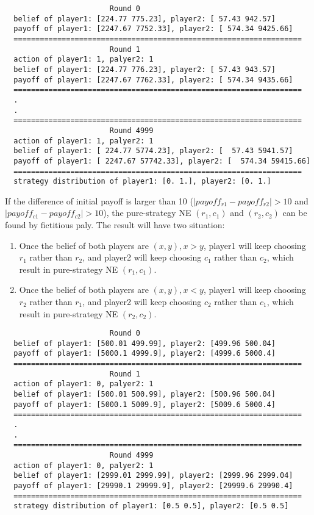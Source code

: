 \documentclass[a4paper, oneside, final, 12pt]{scrartcl} %
\begin{document}
\begin{lstlisting}
                        Round 0
  belief of player1: [224.77 775.23], player2: [ 57.43 942.57]
  payoff of player1: [2247.67 7752.33], player2: [ 574.34 9425.66]
  ==================================================================
                        Round 1
  action of player1: 1, palyer2: 1
  belief of player1: [224.77 776.23], player2: [ 57.43 943.57]
  payoff of player1: [2247.67 7762.33], player2: [ 574.34 9435.66]
  ==================================================================
  .
  .
  ==================================================================
                        Round 4999
  action of player1: 1, palyer2: 1
  belief of player1: [ 224.77 5774.23], player2: [  57.43 5941.57]
  payoff of player1: [ 2247.67 57742.33], player2: [  574.34 59415.66]
  ==================================================================
  strategy distribution of player1: [0. 1.], player2: [0. 1.]
\end{lstlisting}

\begingroup
\raggedright
If the difference of initial payoff is larger than 10
($|payoff_{r1} - payoff_{r2}| > 10$ and $|payoff_{c1} - payoff_{c2}| > 10$),
the pure-strategy NE $(r_1, c_1)$ and $(r_2, c_2)$ 
can be found by fictitious paly. The result will have two situation:

\newpage

\begin{enumerate}
  \item Once the belief of both players are $(x, y), x > y$, 
  player1 will keep choosing $r_1$ rather than $r_2$, 
  and player2 will keep choosing $c_1$ rather than $c_2$, 
  which result in pure-strategy NE $(r_1, c_1)$.
  \item Once the belief of both players are $(x, y), x < y$, 
  player1 will keep choosing $r_2$ rather than $r_1$, 
  and player2 will keep choosing $c_2$ rather than $c_1$, 
  which result in pure-strategy NE $(r_2, c_2)$.
\end{enumerate}

\endgroup

\begin{lstlisting}
                        Round 0
  belief of player1: [500.01 499.99], player2: [499.96 500.04]
  payoff of player1: [5000.1 4999.9], player2: [4999.6 5000.4]
  ==================================================================
                        Round 1
  action of player1: 0, palyer2: 1
  belief of player1: [500.01 500.99], player2: [500.96 500.04]
  payoff of player1: [5000.1 5009.9], player2: [5009.6 5000.4]
  ==================================================================
  .
  .
  ==================================================================
                        Round 4999
  action of player1: 0, palyer2: 1
  belief of player1: [2999.01 2999.99], player2: [2999.96 2999.04]
  payoff of player1: [29990.1 29999.9], player2: [29999.6 29990.4]
  ==================================================================
  strategy distribution of player1: [0.5 0.5], player2: [0.5 0.5]
\end{lstlisting}
\end{document}
